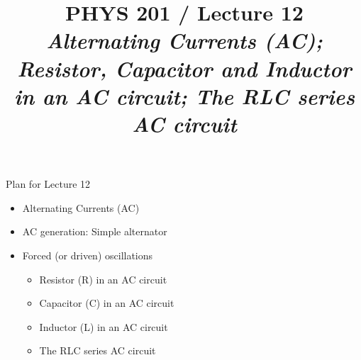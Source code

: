 \renewcommand{\prevlecture}{11 }
\renewcommand{\thislecture}{12 }
\renewcommand{\nextlecture}{0 }

%
%

\title[PHYS 201 / Lecture \thislecture]
{
  PHYS 201 / Lecture \thislecture\\
  {\it Alternating Currents (AC); Resistor, Capacitor and Inductor in an AC circuit; The RLC series AC circuit}\\
}



\begin{frame}[plain]
  \titlepage
\end{frame}


%
%

\renewcommand{\lecturesummarytitle}{Revision }


%
%

\begin{frame}{Plan for Lecture \thislecture}

\begin{itemize}
\item Alternating Currents (AC)
\item AC generation: Simple alternator
\item Forced (or driven) oscillations
  \begin{itemize}
      \item Resistor (R) in an AC circuit
      \item Capacitor (C) in an AC circuit
      \item Inductor (L)  in an AC circuit
      \item The RLC series AC circuit
  \end{itemize}

\end{itemize}

\end{frame}


%
%
%

